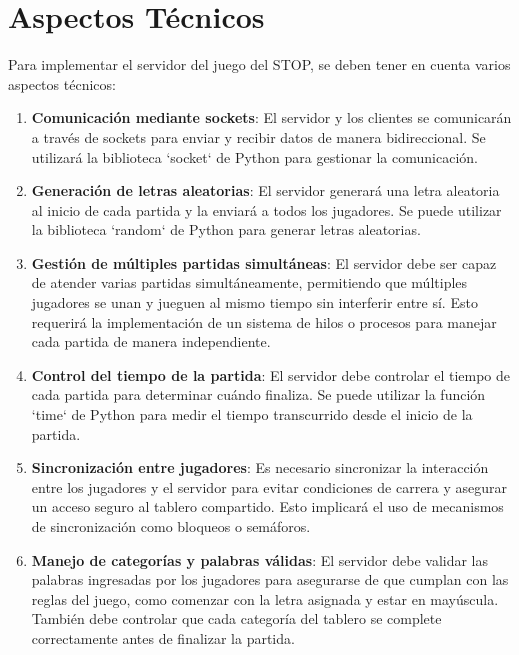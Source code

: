 \documentclass{article}
\begin{document}
\section{Aspectos Técnicos}

Para implementar el servidor del juego del STOP, se deben tener en cuenta varios aspectos técnicos:

\begin{enumerate}
    \item \textbf{Comunicación mediante sockets}: El servidor y los clientes se comunicarán a través de sockets para enviar y recibir datos de manera bidireccional. 
    Se utilizará la biblioteca `socket` de Python para gestionar la comunicación.

    \item \textbf{Generación de letras aleatorias}: El servidor generará una letra aleatoria al inicio de cada partida y la enviará a todos los jugadores. 
    Se puede utilizar la biblioteca `random` de Python para generar letras aleatorias.

    \item \textbf{Gestión de múltiples partidas simultáneas}: El servidor debe ser capaz de atender varias partidas simultáneamente, permitiendo que múltiples jugadores se unan y jueguen 
    al mismo tiempo sin interferir entre sí. Esto requerirá la implementación de un sistema de hilos o procesos para manejar cada partida de manera independiente.

    \item \textbf{Control del tiempo de la partida}: El servidor debe controlar el tiempo de cada partida para determinar cuándo finaliza. Se puede utilizar la función `time` 
    de Python para medir el tiempo transcurrido desde el inicio de la partida.

    \item \textbf{Sincronización entre jugadores}: Es necesario sincronizar la interacción entre los jugadores y el servidor para evitar condiciones de carrera y asegurar un 
    acceso seguro al tablero compartido. Esto implicará el uso de mecanismos de sincronización como bloqueos o semáforos.

    \item \textbf{Manejo de categorías y palabras válidas}: El servidor debe validar las palabras ingresadas por los jugadores para asegurarse de que cumplan con las reglas del juego, 
    como comenzar con la letra asignada y estar en mayúscula. También debe controlar que cada categoría del tablero se complete correctamente antes de finalizar la partida.
\end{enumerate}
\end{document}
